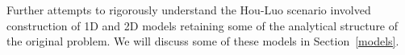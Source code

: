 \documentclass[reqno,centertags, 11pt]{amsart}
\begin{document}
Further attempts to rigorously understand the Hou-Luo scenario involved construction of 1D and 2D models retaining some of the analytical structure
of the original problem. We will discuss some of these models in Section~\ref{models}.

\end{document}
